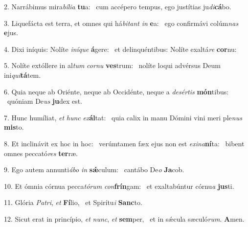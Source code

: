 2. Narrábimus mira\textit{bí}\textit{li}\textit{a} \textbf{tu}a: \ast\  cum accépero tempus, ego justítias ju\textit{di}\textbf{cá}bo.\

3. Liquefácta est terra, et omnes qui há\textit{bi}\textit{tant} \textit{in} \textbf{e}a: \ast\  ego confirmávi colúm\textit{nas} \textbf{e}jus.\

4. Dixi iníquis: Nolíte \textit{in}\textit{í}\textit{que} \textbf{á}gere: \ast\  et delinquéntibus: Nolíte exaltá\textit{re} \textbf{cor}nu:\

5. Nolíte extóllere in al\textit{tum} \textit{cor}\textit{nu} \textbf{ves}trum: \ast\  nolíte loqui advérsus Deum ini\textit{qui}\textbf{tá}tem.\

6. Quia neque ab Oriénte, neque ab Occidénte, neque a \textit{de}\textit{sér}\textit{tis} \textbf{món}tibus: \ast\  quóniam De\textit{us} \textbf{ju}dex est.\

7. Hunc humíliat, \textit{et} \textit{hunc} \textit{ex}\textbf{ál}tat: \ast\  quia calix in manu Dómini vini meri ple\textit{nus} \textbf{mis}to.\

8. Et inclinávit ex hoc in hoc: \dag\  verúmtamen fæx ejus non est \textit{ex}\textit{i}\textit{na}\textbf{ní}ta: \ast\  bibent omnes peccató\textit{res} \textbf{ter}ræ.\

9. Ego autem annunti\textit{á}\textit{bo} \textit{in} \textbf{sǽ}culum: \ast\  cantábo De\textit{o} \textbf{Ja}cob.\

10. Et ómnia córnua pecca\textit{tó}\textit{rum} \textit{con}\textbf{frín}gam: \ast\  et exaltabúntur córnu\textit{a} \textbf{jus}ti.\

11. Glória \textit{Pa}\textit{tri}, \textit{et} \textbf{Fí}lio, \ast\  et Spirítu\textit{i} \textbf{Sanc}to.\

12. Sicut erat in princípio, \textit{et} \textit{nunc}, \textit{et} \textbf{sem}per, \ast\  et in sǽcula sæculó\textit{rum}. \textbf{A}men.\

